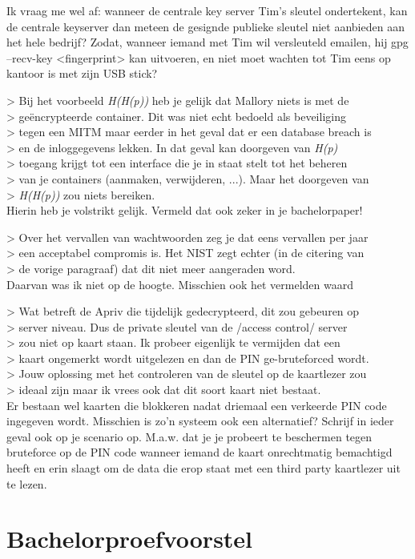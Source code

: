 Ik vraag me wel af: wanneer de centrale key server Tim's sleutel
ondertekent, kan de centrale keyserver dan meteen de gesignde publieke
sleutel niet aanbieden aan het hele bedrijf? Zodat, wanneer iemand met
Tim wil versleuteld emailen, hij gpg --recv-key <fingerprint> kan
uitvoeren, en niet moet wachten tot Tim eens op kantoor is met zijn USB
stick?


> Bij het voorbeeld \textit{H(H(p))} heb je gelijk dat Mallory niets is met de \\
> geëncrypteerde container. Dit was niet echt bedoeld als beveiliging \\
> tegen een MITM maar eerder in het geval dat er een database breach is \\
> en de inloggegevens lekken. In dat geval kan doorgeven van \textit{H(p)} \\
> toegang krijgt tot een interface die je in staat stelt tot het beheren \\
> van je containers (aanmaken, verwijderen, ...). Maar het doorgeven van \\
> \textit{H(H(p))} zou niets bereiken. \\

Hierin heb je volstrikt gelijk. Vermeld dat ook zeker in je bachelorpaper!


> Over het vervallen van wachtwoorden zeg je dat eens vervallen per jaar \\
> een acceptabel compromis is. Het NIST zegt echter (in de citering van \\
> de vorige paragraaf) dat dit niet meer aangeraden word. \\

Daarvan was ik niet op de hoogte. Misschien ook het vermelden waard

> Wat betreft de Apriv die tijdelijk gedecrypteerd, dit zou gebeuren op \\
> server niveau. Dus de private sleutel van de /access control/ server \\
> zou niet op kaart staan. Ik probeer eigenlijk te vermijden dat een \\
> kaart ongemerkt wordt uitgelezen en dan de PIN ge-bruteforced wordt. \\
> Jouw oplossing met het controleren van de sleutel op de kaartlezer zou \\
> ideaal zijn maar ik vrees ook dat dit soort kaart niet bestaat. \\

Er bestaan wel kaarten die blokkeren nadat driemaal een verkeerde PIN
code ingegeven wordt. Misschien is zo'n systeem ook een alternatief?
Schrijf in ieder geval ook op je scenario op. M.a.w. dat je je probeert
te beschermen tegen bruteforce op de PIN code wanneer iemand de kaart
onrechtmatig bemachtigd heeft en erin slaagt om de data die erop staat
met een third party kaartlezer uit te lezen.

\section{Bachelorproefvoorstel}

